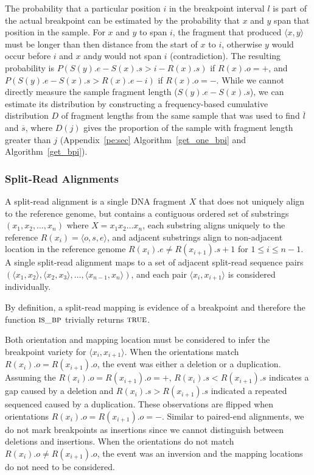 \documentclass[10pt]{bmc_article}
\newenvironment{bmcformat}{\begin{raggedright}\baselineskip20pt\sloppy\setboolean{publ}{false}}{\end{raggedright}\baselineskip20pt\sloppy}
\begin{document}
\begin{bmcformat}
The probability that a particular position $i$ in the breakpoint interval $l$ is
part of the actual breakpoint can be estimated by the probability that $x$ and
$y$ span that position in the sample. For $x$ and $y$ to span $i$, the fragment
that produced $\langle x,y \rangle$ must be longer than then distance from the
start of $x$ to $i$, otherwise $y$ would occur before $i$ and $x$ and$y$ would
not span $i$ (contradiction).  The resulting probability is
$P(S(y).e - S(x).s > i - R(x).s)$ if $R(x).o=+$, and
$P(S(y).e - S(x).s > R(x).e - i)$ if $R(x).o=-$.
While we cannot directly measure the sample fragment length ($S(y).e - S(x).s$),
we can estimate its distribution by constructing a frequency-based cumulative
distribution $D$ of fragment lengths from the same sample that was used to find
$\overline{l}$ and $\overline{s}$, where $D(j)$ gives the proportion of the
sample with fragment length greater than $j$ (Appendix~\ref{pe:sec}
Algorithm~\ref{get_one_bpi} and Algorithm~\ref{get_bpi}).

\subsubsection*{Split-Read Alignments}

A split-read alignment is a single DNA fragment $X$ that does not uniquely align
to the reference genome, but contains a contiguous ordered set of substrings
$(x_1, x_2, \dots, x_n)$ where $X=x_1x_2\dots x_n$, each substring aligns
uniquely to the reference $R(x_i)=\langle o,s,e \rangle$, and adjacent
substrings align to non-adjacent location in the reference genome
$R(x_{i}).e \neq R(x_{i+1}).s + 1$ for $1\leq i \leq n-1$. A single split-read
alignment maps to a set of adjacent split-read sequence pairs
$(\langle x_1 , x_2 \rangle, \langle x_2, x_3 \rangle, \dots ,
\langle x_{n-1},x_n \rangle)$, and each pair $\langle x_i,x_{i+1} \rangle$ is
considered individually.

By definition, a split-read mapping is evidence of a breakpoint and therefore
the function $\textsc{is\_bp}$ trivially returns $\textsc{true}$.

Both orientation and mapping location must be considered to infer the breakpoint
variety for $\langle x_i,x_{i+1} \rangle$.  When the orientations match
$R(x_{i}).o=R(x_{i+1}).o$, the event was either a deletion or
a duplication.  Assuming the $R(x_{i}).o=R(x_{i+1}).o=+$,
$R(x_{i}).s<R(x_{i+1}).s$ indicates a gap caused by a deletion and
$R(x_{i}).s>R(x_{i+1}).s$ indicated a repeated sequenced caused by a
duplication.   These observations are flipped when orientations
$R(x_{i}).o=R(x_{i+1}).o=-$.  Similar to paired-end alignments, we do not mark
breakpoints as insertions since we cannot distinguish between deletions
and insertions.  When the orientations do not match $R(x_{i}).o \ne
R(x_{i+1}).o$, the event was an inversion and the mapping locations do not need
to be considered.


\end{bmcformat}
\end{document}
